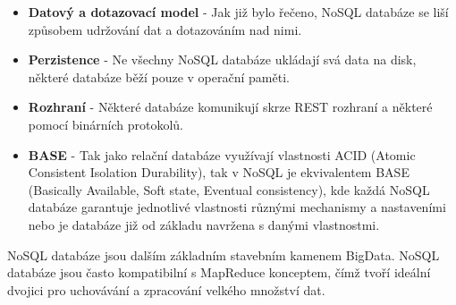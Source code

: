 \begin{itemize}
\item \textbf{Datový a dotazovací model} - Jak již bylo řečeno, NoSQL databáze se liší způsobem udržování dat a dotazováním nad nimi.
\item \textbf{Perzistence} - Ne všechny NoSQL databáze ukládají svá data na disk, některé databáze běží pouze v operační paměti.
\item \textbf{Rozhraní} - Některé databáze komunikují skrze REST rozhraní a některé pomocí binárních protokolů. 
\item \textbf{BASE} - Tak jako relační databáze využívají vlastnosti ACID (Atomic Consistent Isolation Durability), tak v NoSQL je ekvivalentem BASE (Basically Available, Soft state, Eventual consistency), kde každá NoSQL databáze garantuje jednotlivé vlastnosti různými mechanismy a nastaveními nebo je databáze již od základu navržena s danými vlastnostmi.   
\end{itemize}


NoSQL databáze jsou dalším základním stavebním kamenem BigData. NoSQL databáze jsou často kompatibilní s MapReduce konceptem, čímž tvoří ideální dvojici pro uchovávání a zpracování velkého množství dat. 

